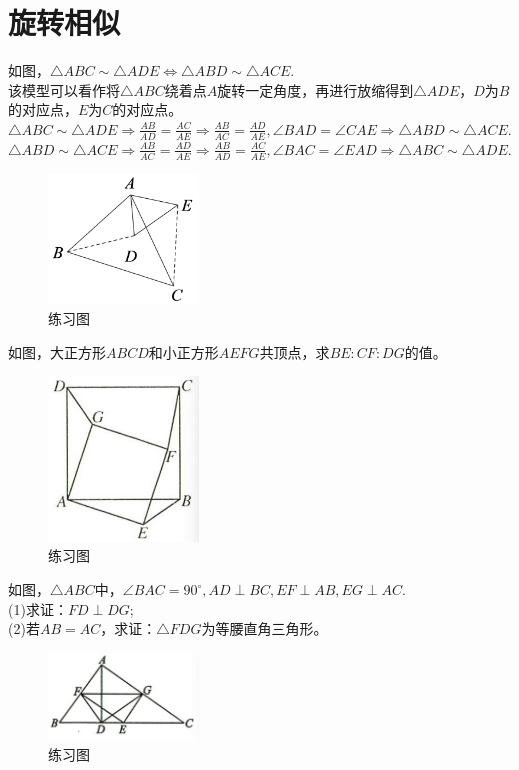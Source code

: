 \documentclass{ecnuthesis}
\begin{document}
\section{旋转相似}
\begin{model}
    如图，$\triangle ABC\sim \triangle ADE \Leftrightarrow \triangle ABD \sim \triangle ACE$. \\
    该模型可以看作将$\triangle ABC$绕着点$A$旋转一定角度，再进行放缩得到$\triangle ADE$，$D$为$B$的对应点，$E$为$C$的对应点。\\
    $\triangle ABC\sim \triangle ADE \Rightarrow \frac{AB}{AD}=\frac{AC}{AE} \Rightarrow \frac{AB}{AC}=\frac{AD}{AE},\angle BAD=\angle CAE \Rightarrow \triangle ABD \sim \triangle ACE.$ \\
    $\triangle ABD\sim \triangle ACE \Rightarrow \frac{AB}{AC}=\frac{AD}{AE} \Rightarrow \frac{AB}{AD}=\frac{AC}{AE},\angle BAC=\angle EAD \Rightarrow \triangle ABC \sim \triangle ADE.$
\end{model}
\begin{figure}[H]
\centering
\includegraphics[width=4cm]{picture/855.png}
\caption{练习图}
\end{figure}
\begin{problem}
    如图，大正方形$ABCD$和小正方形$AEFG$共顶点，求$BE:CF:DG$的值。
\end{problem}
\begin{figure}[H]
\centering
\includegraphics[width=4cm]{picture/856.png}
\caption{练习图}
\end{figure}
\begin{problem}
    如图，$\triangle ABC$中，$\angle BAC=90^\circ,AD\perp BC,EF\perp AB,EG\perp AC$. \\
    (1)求证：$FD\perp DG$; \\
    (2)若$AB=AC$，求证：$\triangle FDG$为等腰直角三角形。
\end{problem}
\begin{figure}[H]
\centering
\includegraphics[width=4cm]{picture/845.png}
\caption{练习图}
\end{figure}
\clearpage
\end{document}
